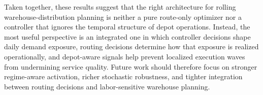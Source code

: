Taken together, these results suggest that the right architecture for rolling warehouse-distribution planning is neither a pure route-only optimizer nor a controller that ignores the temporal structure of depot operations. Instead, the most useful perspective is an integrated one in which controller decisions shape daily demand exposure, routing decisions determine how that exposure is realized operationally, and depot-aware signals help prevent localized execution waves from undermining service quality. Future work should therefore focus on stronger regime-aware activation, richer stochastic robustness, and tighter integration between routing decisions and labor-sensitive warehouse planning.
